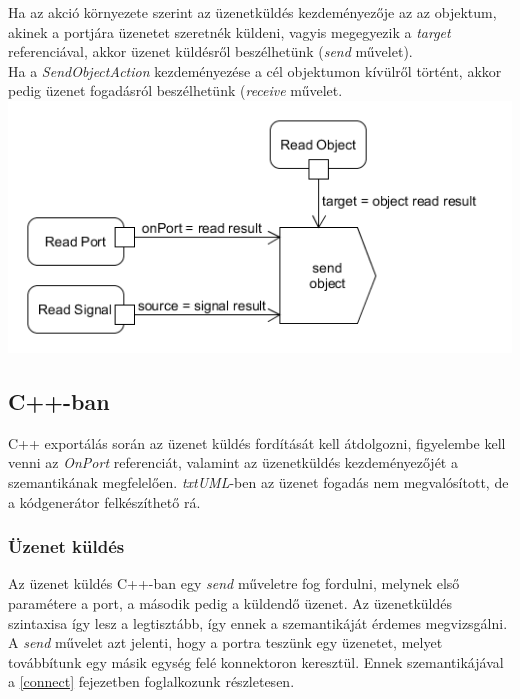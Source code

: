 \documentclass[a4paper,12pt]{report}
\begin{document}
Ha az akció környezete szerint az üzenetküldés kezdeményezője az az objektum, akinek a portjára üzenetet szeretnék küldeni, vagyis megegyezik a \textit{target} referenciával, akkor üzenet küldésről beszélhetünk (\textit{send} művelet). \\
Ha a \textit{SendObjectAction} kezdeményezése a cél objektumon kívülről történt, akkor pedig üzenet fogadásról beszélhetünk (\textit{receive} művelet. \\
 

\includegraphics[scale=0.6]{receive_uml.png}

\subsection{C++-ban}
C++ exportálás során az üzenet küldés fordítását kell átdolgozni, figyelembe kell venni az \textit{OnPort} referenciát, valamint az üzenetküldés kezdeményezőjét a szemantikának megfelelően. \textit{txtUML}-ben az üzenet fogadás nem megvalósított, de a kódgenerátor felkészíthető rá.

\subsubsection{Üzenet küldés}
Az üzenet küldés C++-ban egy \textit{send} műveletre fog fordulni, melynek első paramétere a port, a második pedig a küldendő üzenet. Az üzenetküldés szintaxisa így lesz a legtisztább, így ennek a szemantikáját érdemes megvizsgálni. A \textit{send} művelet azt jelenti, hogy a portra teszünk egy üzenetet, melyet továbbítunk egy másik egység felé konnektoron keresztül. Ennek szemantikájával a \ref{connect} fejezetben foglalkozunk részletesen.
\end{document}
